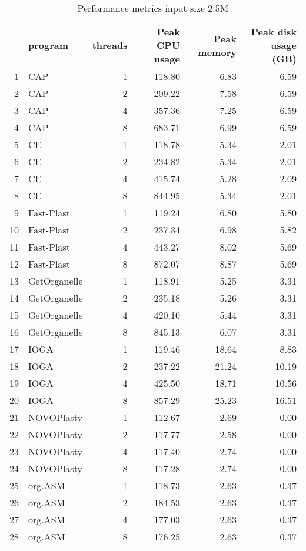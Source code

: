 \documentclass[oneside,10pt,A4]{scrartcl}
\begin{document}
\begin{table}[ht]
\caption{Performance metrics input size 2.5M}
\label{tab:perform2.5M_suppl}
\centering
\begin{tabular}{rlrrrr}
  \toprule
 & program & threads & Peak CPU usage & Peak memory & Peak disk usage (GB) \\ 
 \midrule
1 & CAP &   1 & 118.80 & 6.83 & 6.59 \\ 
  2 & CAP &   2 & 209.22 & 7.58 & 6.59 \\ 
  3 & CAP &   4 & 357.36 & 7.25 & 6.59 \\ 
  4 & CAP &   8 & 683.71 & 6.99 & 6.59 \\ 
  5 & CE &   1 & 118.78 & 5.34 & 2.01 \\ 
  6 & CE &   2 & 234.82 & 5.34 & 2.01 \\ 
  7 & CE &   4 & 415.74 & 5.28 & 2.09 \\ 
  8 & CE &   8 & 844.95 & 5.34 & 2.01 \\ 
  9 & Fast-Plast &   1 & 119.24 & 6.80 & 5.80 \\ 
  10 & Fast-Plast &   2 & 237.34 & 6.98 & 5.82 \\ 
  11 & Fast-Plast &   4 & 443.27 & 8.02 & 5.69 \\ 
  12 & Fast-Plast &   8 & 872.07 & 8.87 & 5.69 \\ 
  13 & GetOrganelle &   1 & 118.91 & 5.25 & 3.31 \\ 
  14 & GetOrganelle &   2 & 235.18 & 5.26 & 3.31 \\ 
  15 & GetOrganelle &   4 & 420.10 & 5.44 & 3.31 \\ 
  16 & GetOrganelle &   8 & 845.13 & 6.07 & 3.31 \\ 
  17 & IOGA &   1 & 119.46 & 18.64 & 8.83 \\ 
  18 & IOGA &   2 & 237.22 & 21.24 & 10.19 \\ 
  19 & IOGA &   4 & 425.50 & 18.71 & 10.56 \\ 
  20 & IOGA &   8 & 857.29 & 25.23 & 16.51 \\ 
  21 & NOVOPlasty &   1 & 112.67 & 2.69 & 0.00 \\ 
  22 & NOVOPlasty &   2 & 117.77 & 2.58 & 0.00 \\ 
  23 & NOVOPlasty &   4 & 117.40 & 2.74 & 0.00 \\ 
  24 & NOVOPlasty &   8 & 117.28 & 2.74 & 0.00 \\ 
  25 & org.ASM &   1 & 118.73 & 2.63 & 0.37 \\ 
  26 & org.ASM &   2 & 184.53 & 2.63 & 0.37 \\ 
  27 & org.ASM &   4 & 177.03 & 2.63 & 0.37 \\ 
  28 & org.ASM &   8 & 176.25 & 2.63 & 0.37 \\ 
   \bottomrule
\end{tabular}
\end{table}
\end{document}
